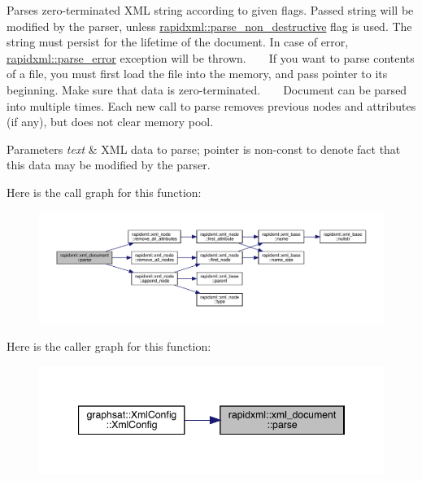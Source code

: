 Parses zero-\/terminated X\+ML string according to given flags. Passed string will be modified by the parser, unless \mbox{\hyperlink{namespacerapidxml_a45d4d8fef551beaaba23a83b847fd6a3}{rapidxml\+::parse\+\_\+non\+\_\+destructive}} flag is used. The string must persist for the lifetime of the document. In case of error, \mbox{\hyperlink{classrapidxml_1_1parse__error}{rapidxml\+::parse\+\_\+error}} exception will be thrown. ~\newline
~\newline
 If you want to parse contents of a file, you must first load the file into the memory, and pass pointer to its beginning. Make sure that data is zero-\/terminated. ~\newline
~\newline
 Document can be parsed into multiple times. Each new call to parse removes previous nodes and attributes (if any), but does not clear memory pool.
\begin{DoxyParams}{Parameters}
{\em text} & X\+ML data to parse; pointer is non-\/const to denote fact that this data may be modified by the parser. \\
\hline
\end{DoxyParams}
Here is the call graph for this function\+:\nopagebreak
\begin{figure}[H]
\begin{center}
\leavevmode
\includegraphics[width=350pt]{classrapidxml_1_1xml__document_ac6e73ff9ac323bf5a370c38feb03a6b1_cgraph}
\end{center}
\end{figure}
Here is the caller graph for this function\+:\nopagebreak
\begin{figure}[H]
\begin{center}
\leavevmode
\includegraphics[width=347pt]{classrapidxml_1_1xml__document_ac6e73ff9ac323bf5a370c38feb03a6b1_icgraph}
\end{center}
\end{figure}
\mbox{\label{classrapidxml_1_1xml__document_aec6cedf45179b6378c670bc3ea509e61}} 
